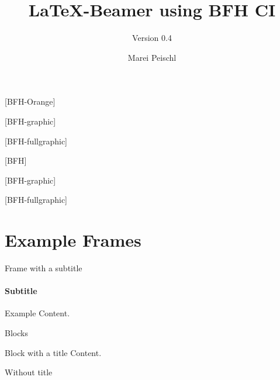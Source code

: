\documentclass[
	ngerman,%
	]{bfhbeamer}
\title{\LaTeX-Beamer using BFH CI}
\subtitle{Version 0.4}
\author[M. Peischl]{Marei Peischl}
\institute{pei\TeX}
\begin{document}
\maketitle

[BFH-Orange]
\maketitle

[BFH-graphic]

\maketitle

[BFH-fullgraphic]
\maketitle

\frame[plain]{\maketitle}

[BFH]
\frame[plain]{\maketitle}


[BFH-graphic]
\frame[plain]{\maketitle}

[BFH-fullgraphic]
\frame[plain]{\maketitle}


\section{Example Frames}

\begin{frame}{Frame with a subtitle}
	\framesubtitle{Subtitle}
	Example Content.
\end{frame}

\begin{frame}{Blocks}
	\begin{block}{Block with a title}
		Content.
	\end{block}
	\begin{block}{}
		Without title
	\end{block}
\end{frame}
\end{document}
